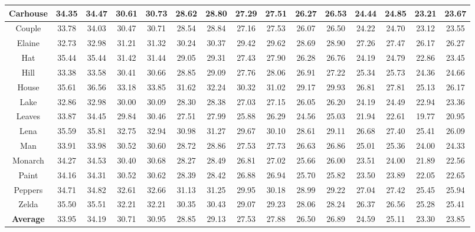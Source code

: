 \begin{table}[t!]
\begin{adjustwidth}{-1.5cm}{}
\begin{tabular}{|c||c|c||c|c||c|c||c|c||c|c||c|c||c|c|}
\hline
Carhouse&34.35 &34.47     &30.61&30.73   &28.62 & 28.80  & 27.29&27.51  &26.27 &26.53  &24.44&24.85    &23.21&23.67
\\
\hline
Couple &33.78&34.03       &30.47&30.71  & 28.54 & 28.84 & 27.16 & 27.53   &26.07 & 26.50  &24.22 &24.70   &23.12 &23.55
\\
\hline
Elaine&32.73&32.98   &31.21&31.32    &30.24& 30.37   &29.42&29.62   &28.69 &28.90   &27.26&27.47   &26.17&26.27
\\
\hline
Hat&35.44&35.44      &31.42 &31.44  & 29.05&29.31   &27.43&27.90  & 26.28 &26.76  &24.19 & 24.79    &22.86&23.45
\\
\hline
Hill&33.38&33.58     &30.41&30.66   &28.85 & 29.09   &27.76 & 28.06  & 26.91 &27.22  &25.34 & 25.73   &24.36 &24.66
\\
\hline
House&35.61&36.56      &33.18&33.85   & 31.62& 32.24  &30.32 &31.02  & 29.17 &29.93   &26.81 & 27.81  & 25.13&26.17  
\\
\hline
Lake&32.86&32.98     &30.00&30.09   &28.30 &28.38   &27.03 & 27.15  & 26.05 &26.20   &24.19 &24.49    &22.94 &23.36
\\
\hline
Leaves&33.87& 34.45     &29.84&30.46    &27.51 &27.99  & 25.88 & 26.29  &24.56 &25.03   &21.94& 22.61   &19.77&20.95
\\
\hline  
Lena&35.59&35.81     &32.75&32.94  &30.98 &31.27  &29.67 &30.10   &28.61 & 29.11   &26.68 &  27.40      &25.41 &26.09
\\
\hline
Man&33.91&33.98      &30.52&30.60  & 28.72 & 28.86   &27.53 & 27.73   &26.63 &  26.86  &25.01& 25.36     &24.00 &24.33 
\\
\hline
Monarch&34.27&34.53    &30.40&30.68   & 28.27&28.49    &26.81 &27.02  &25.66 & 26.00  &23.51 & 24.00       &21.89 &22.56 
\\
\hline
Paint &34.16&34.31    &30.52&30.62   &28.39 &28.42   & 26.88 & 26.94  &25.70 & 25.82 &23.50& 23.89  &22.05&22.65
\\
\hline
Peppers&34.71&34.82    & 32.61&32.66   &31.13 & 31.25 &29.95  & 30.18  &28.99 & 29.22  &27.04&  27.42    &25.45 &25.94
\\  
\hline
Zelda&35.50&35.51    &32.21&32.21  & 30.35 &30.43   &29.07 &29.23   & 28.06& 28.24  &26.37& 26.56     &25.28&25.41
\\
\hline
\textbf{Average}&33.95&34.19    &30.71&30.95   & 28.85 & 29.13   &27.53&27.88   & 26.50 & 26.89  &24.59 &25.11  &23.30&23.85       
\\
\hline
\end{tabular}
\end{adjustwidth}
\end{table}

